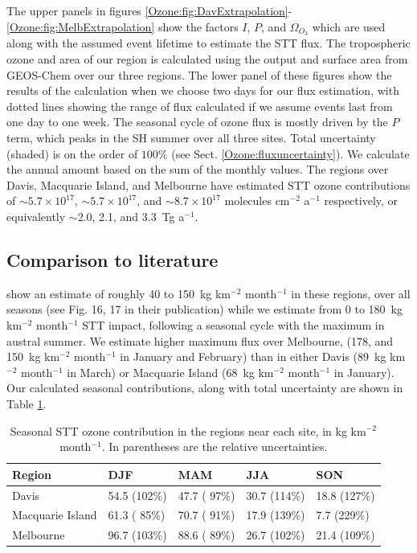     The upper panels in figures \ref{Ozone:fig:DavExtrapolation}-\ref{Ozone:fig:MelbExtrapolation} show the factors $I$, $P$, and $\Omega_{O_3}$ which are used along with the assumed event lifetime to estimate the STT flux.
    The tropospheric ozone and area of our region is calculated using the output and surface area from GEOS-Chem over our three regions.
    The lower panel of these figures show the results of the calculation when we choose two days for our flux estimation, with dotted lines showing the range of flux calculated if we assume events last from one day to one week.
    The seasonal cycle of ozone flux is mostly driven by the $P$ term, which peaks in the SH summer over all three sites.
    Total uncertainty (shaded) is on the order of $100\%$ (see Sect. \ref{Ozone:fluxuncertainty}). 
    We calculate the annual amount based on the sum of the monthly values.
    The regions over Davis, Macquarie Island, and Melbourne have estimated STT ozone contributions of $\sim 5.7 \times 10^{17}$, $\sim 5.7 \times 10^{17}$, and $\sim 8.7 \times 10^{17}$ molecules cm$^{-2}$ a$^{-1}$ respectively, or equivalently $\sim 2.0$, 2.1, and 3.3~Tg a$^{-1}$.
  
  \subsection{Comparison to literature}
    \cite{Skerlak2014} show an estimate of roughly 40 to 150~kg km$^{-2}$ month$^{-1}$ in these regions, over all seasons (see Fig. 16, 17 in their publication) while we estimate from 0 to 180~kg km$^{-2}$ month$^{-1}$ STT impact, following a seasonal cycle with the maximum in austral summer.
    We estimate higher maximum flux over Melbourne, (178, and 150~kg km$^{-2}$ month$^{-1}$ in January and February) than in either Davis (89~kg km$^{-2}$ month$^{-1}$ in March) or Macquarie Island (68~kg km$^{-2}$ month$^{-1}$ in January).
    Our calculated seasonal contributions, along with total uncertainty are shown in Table \ref{Ozone:fig:extrapolationResults}.
    
    \begin{table}[t]
      \captionsetup{justification=centering}
      \caption{Seasonal STT ozone contribution in the regions near each site, in kg km$^{-2}$ month$^{-1}$. In parentheses are the relative uncertainties.}
      \begin{tabular}{ l l l l l } 
        \hline
        Region & DJF & MAM & JJA & SON \\
        \hline
        Davis        &  54.5 (102\%) & 47.7 ( 97\%) & 30.7 (114\%) & 18.8 (127\%)\\ 
        Macquarie Island   & 61.3 ( 85\%) & 70.7 ( 91\%) & 17.9 (139\%) &  7.7 (229\%) \\
        Melbourne   & 96.7 (103\%) & 88.6 ( 89\%) & 26.7 (102\%) & 21.4 (109\%) \\
        \hline
      \end{tabular}
      \label{Ozone:fig:extrapolationResults}
    \end{table}
    
